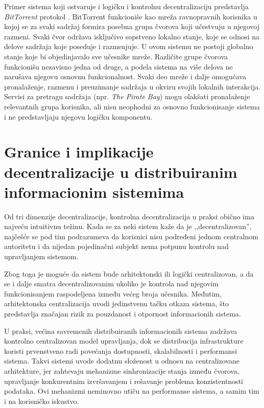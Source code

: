 Primer sistema koji ostvaruje i logičku i kontrolnu decentralizaciju predstavlja \textit{BitTorrent} protokol \cite{cohen2003incentives}. BitTorrent funkcioniše kao mreža ravnopravnih korisnika u kojoj se za svaki sadržaj formira posebna grupa čvorova koji učestvuju u njegovoj razmeni. Svaki čvor održava isključivo sopstveno lokalno stanje, koje se odnosi na delove sadržaja koje poseduje i razmenjuje. U ovom sistemu ne postoji globalno stanje koje bi objedinjavalo sve učesnike mreže. Različite grupe čvorova funkcionišu nezavisno jedna od druge, a podela sistema na više delova ne narušava njegovu osnovnu funkcionalnost. Svaki deo mreže i dalje omogućava pronalaženje, razmenu i preuzimanje sadržaja u okviru svojih lokalnih interakcija. Servisi za pretragu sadržaja (npr. \textit{The Pirate Bay}) mogu olakšati pronalaženje relevantnih grupa korisnika, ali nisu neophodni za osnovno funkcionisanje sistema i ne predstavljaju njegovu logičku komponentu.

\section{Granice i implikacije decentralizacije u distribuiranim informacionim sistemima}
Od tri dimenzije decentralizacije, kontrolna decentralizacija u praksi obično ima najveću intuitivnu težinu. Kada se za neki sistem kaže da je ,,decentralizovan'', najčešće se pod tim podrazumeva da korisnici nisu podređeni jednom centralnom autoritetu i da nijedan pojedinačni subjekt nema potpunu kontrolu nad upravljanjem sistemom. 

Zbog toga je moguće da sistem bude arhitektonski ili logički centralizovan, a da se i dalje smatra decentralizovanim ukoliko je kontrola nad njegovim funkcionisanjem raspodeljena između većeg broja učesnika. Međutim, arhitektonska centralizacija uvodi jedinstvenu tačku otkaza sistema, što predstavlja značajan rizik za pouzdanost i otpornost informacionih sistema.

U praksi, većina savremenih distribuiranih informacionih sistema zadržava kontrolno centralizovan model upravljanja, dok se distribucija infrastrukture koristi prvenstveno radi povećanja dostupnosti, skalabilnosti i performansi sistema. Takvi sistemi uvode dodatnu složenost u odnosu na centralizovane arhitekture, jer zahtevaju mehanizme sinhronizacije stanja između čvorova, upravljanje konkurentnim izvršavanjem i rešavanje problema konzistentnosti podataka. Ovi mehanizmi neminovno utiču na performanse sistema, a samim tim i na korisničko iskustvo.

